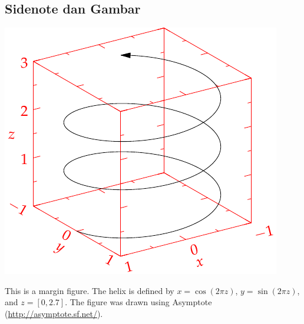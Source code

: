 \documentclass{article}
\begin{document}
\subsection{Sidenote dan Gambar}

\begin{marginfigure}%
  \includegraphics[width=\linewidth]{gambar/helix}
  \caption{This is a margin figure.  The helix is defined by 
    $x = \cos(2\pi z)$, $y = \sin(2\pi z)$, and $z = [0, 2.7]$.  The figure was
    drawn using Asymptote (\url{http://asymptote.sf.net/}).}
  \label{fig:marginfig}
\end{marginfigure}
\end{document}
